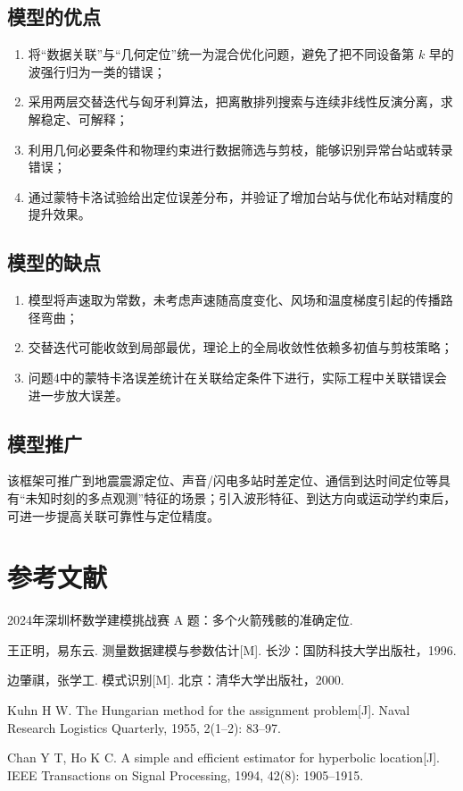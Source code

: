 \documentclass[12pt,a4paper]{article}
\begin{document}
\subsection{模型的优点}

\begin{enumerate}[label=\arabic*.]
  \item 将“数据关联”与“几何定位”统一为混合优化问题，避免了把不同设备第 $k$ 早的波强行归为一类的错误；
  \item 采用两层交替迭代与匈牙利算法，把离散排列搜索与连续非线性反演分离，求解稳定、可解释；
  \item 利用几何必要条件和物理约束进行数据筛选与剪枝，能够识别异常台站或转录错误；
  \item 通过蒙特卡洛试验给出定位误差分布，并验证了增加台站与优化布站对精度的提升效果。
\end{enumerate}

\subsection{模型的缺点}

\begin{enumerate}[label=\arabic*.]
  \item 模型将声速取为常数，未考虑声速随高度变化、风场和温度梯度引起的传播路径弯曲；
  \item 交替迭代可能收敛到局部最优，理论上的全局收敛性依赖多初值与剪枝策略；
  \item 问题4中的蒙特卡洛误差统计在关联给定条件下进行，实际工程中关联错误会进一步放大误差。
\end{enumerate}

\subsection{模型推广}

该框架可推广到地震震源定位、声音/闪电多站时差定位、通信到达时间定位等具有“未知时刻的多点观测”特征的场景；引入波形特征、到达方向或运动学约束后，可进一步提高关联可靠性与定位精度。

\section{参考文献}

\begin{enumerate}[label={[\arabic*]}]
  \item 2024年深圳杯数学建模挑战赛 A 题：多个火箭残骸的准确定位.
  \item 王正明，易东云. 测量数据建模与参数估计[M]. 长沙：国防科技大学出版社，1996.
  \item 边肇祺，张学工. 模式识别[M]. 北京：清华大学出版社，2000.
  \item Kuhn H W. The Hungarian method for the assignment problem[J]. Naval Research Logistics Quarterly, 1955, 2(1--2): 83--97.
  \item Chan Y T, Ho K C. A simple and efficient estimator for hyperbolic location[J]. IEEE Transactions on Signal Processing, 1994, 42(8): 1905--1915.
\end{enumerate}
\end{document}
